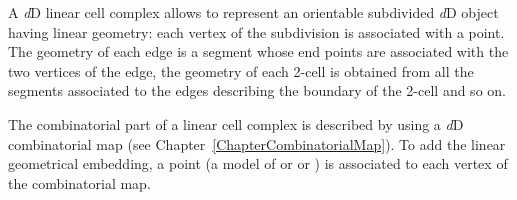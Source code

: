 A \emph{d}D linear cell complex allows to represent an orientable
subdivided \emph{d}D object having linear geometry: each vertex of the
subdivision is associated with a point. The geometry of each edge is a
segment whose end points are associated with the two vertices of the
edge, the geometry of each 2-cell is obtained from all the segments
associated to the edges describing the boundary of the 2-cell and so
on.

The combinatorial part of a linear cell complex is described by using
a \emph{d}D combinatorial map (see  Chapter~\ref{ChapterCombinatorialMap}).
To add the linear geometrical embedding, a point (a model of
 or  or ) is
associated to each vertex of the combinatorial map.

